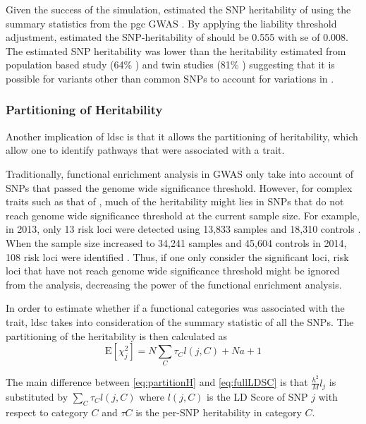 	Given  the success of the simulation, \citet{Bulik-Sullivan2015} estimated the \gls{SNP} heritability of  using the summary statistics from the \gls{pgc}  \gls{GWAS} \citep{Ripke2014}.
	By applying the liability threshold adjustment, \citet{Bulik-Sullivan2015} estimated the \gls{SNP}-heritability of  should be 0.555 with \gls{se} of 0.008.
	The estimated \gls{SNP} heritability was lower than the heritability estimated from population based study (64\% \citep{Lichtenstein2009}) and twin studies (81\% \citep{Sullivan2003}) suggesting that it is possible for variants other than common \glspl{SNP} to account for variations in .
	
	\subsubsection{Partitioning of Heritability}
	Another implication of \gls{ldsc} is that it allows the partitioning of heritability, which allow one to identify pathways that were associated with a trait.
	
	Traditionally, functional enrichment analysis in \gls{GWAS} only take into account of \glspl{SNP} that passed the genome wide significance threshold. 
	However, for complex traits such as that of , much of the heritability might lies in \glspl{SNP} that do not reach genome wide significance threshold at the current sample size.
	For example, in 2013, only 13 risk loci were detected using 13,833  samples and 18,310 controls \citep{Ripke2013}. 
	When the sample size increased to 34,241  samples and 45,604 controls in 2014, 108 risk loci were identified \citep{Ripke2014}. 
	Thus, if one only consider the significant loci, risk loci that have not reach genome wide significance threshold might be ignored from the analysis, decreasing the power of the functional enrichment analysis.

	In order to estimate whether if a functional categories was associated with the trait, \gls{ldsc} takes into consideration of the summary statistic of all the \glspl{SNP}.
	The partitioning of the heritability is then calculated as 
	\begin{equation}
	\mathrm{E}[\chi^2_j] = N\sum_C\tau_Cl(j,C)+Na+1
	\label{eq:partitionH}
	\end{equation}
	
	The main difference between \cref{eq:partitionH} and \cref{eq:fullLDSC} is that $\frac{h^2}{M}l_j$ is substituted by $\sum_C\tau_Cl(j,C)$ where $l(j,C)$ is the \gls{LD} Score of \gls{SNP} $j$ with respect
	to category $C$ and $\tau C$ is the per-\gls{SNP} heritability in category $C$.
	
